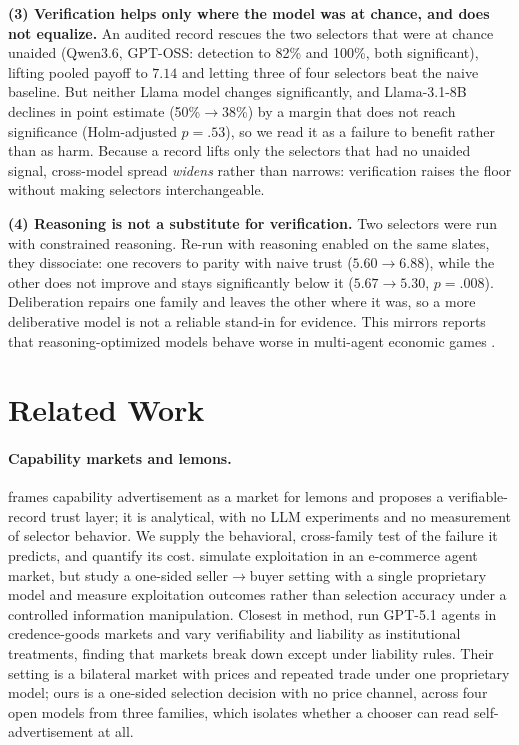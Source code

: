 \documentclass[11pt]{article}
\begin{document}
\noindent\textbf{(3) Verification helps only where the model was at chance, and does not
equalize.} An audited record rescues the two selectors that were at chance unaided
(Qwen3.6, GPT-OSS: detection to 82\% and 100\%, both significant), lifting pooled payoff
to $7.14$ and letting three of four selectors beat the naive baseline. But neither Llama
model changes significantly, and Llama-3.1-8B declines in point estimate
(50\%$\rightarrow$38\%) by a margin that does not reach significance (Holm-adjusted
$p{=}.53$), so we read it as a failure to benefit rather than as harm. Because a record
lifts only the selectors that had no unaided signal, cross-model spread \emph{widens}
rather than narrows: verification raises the floor without making selectors
interchangeable.

\noindent\textbf{(4) Reasoning is not a substitute for verification.} Two selectors were run
with constrained reasoning. Re-run with reasoning enabled on the same slates, they
dissociate: one recovers to parity with naive trust ($5.60\rightarrow6.88$), while the other
does not improve and stays significantly below it ($5.67\rightarrow5.30$, $p{=}.008$).
Deliberation repairs one family and leaves the other where it was, so a more deliberative
model is not a reliable stand-in for evidence. This mirrors reports that reasoning-optimized
models behave worse in multi-agent economic games \cite{piedrahita2025corrupted}.

\section{Related Work}

\paragraph{Capability markets and lemons.} \citet{mittal2026capability} frames
capability advertisement as a market for lemons and proposes a verifiable-record trust
layer; it is analytical, with no LLM experiments and no measurement of selector
behavior. We supply the behavioral, cross-family test of the failure it predicts, and
quantify its cost. \citet{lei2026strategic} simulate exploitation in an e-commerce agent
market, but study a one-sided seller$\rightarrow$buyer setting with a single proprietary
model and measure exploitation outcomes rather than selection accuracy under a
controlled information manipulation. Closest in method, \citet{erlei2026asymmetries} run
GPT-5.1 agents in credence-goods markets and vary verifiability and liability as
institutional treatments, finding that markets break down except under liability rules.
Their setting is a bilateral market with prices and repeated trade under one proprietary
model; ours is a one-sided selection decision with no price channel, across four open models
from three families, which isolates whether a chooser can read self-advertisement at all.
\end{document}
